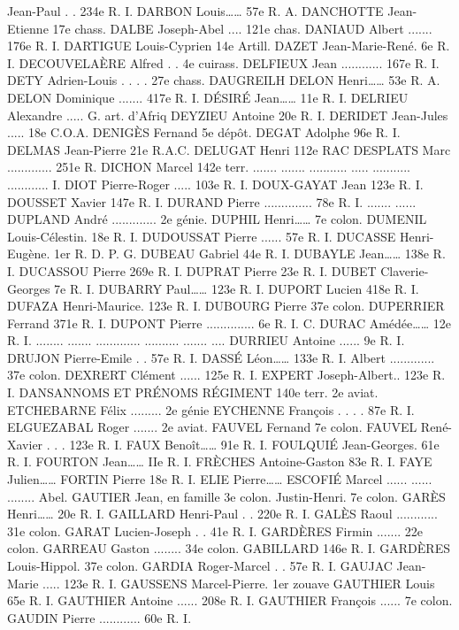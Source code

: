 \documentclass[a4paper,11pt]{book}
\begin{document}
Jean-Paul . . 234e R. I.
DARBON Louis……
57e R. A.
DANCHOTTE Jean-Etienne 17e chass.
DALBE Joseph-Abel .... 121e chas.
DANIAUD Albert ....... 176e R. I.
DARTIGUE Louis-Cyprien 14e Artill.
DAZET Jean-Marie-René. 6e R. I.
DECOUVELAÈRE Alfred . . 4e cuirass.
DELFIEUX Jean ............ 167e R. I.
DETY Adrien-Louis . . . . 27e chass.
DAUGREILH
DELON Henri……
53e R. A.
DELON Dominique ....... 417e R. I.
DÉSIRÉ Jean……
11e R. I.
DELRIEU Alexandre ..... G. art. d'Afriq
DEYZIEU Antoine
20e R. I.
DERIDET Jean-Jules ..... 18e C.O.A.
DENIGÈS Fernand
5e dépôt.
DEGAT Adolphe
96e R. I.
DELMAS Jean-Pierre
21e R.A.C.
DELUGAT Henri
112e RAC
DESPLATS Marc ............. 251e R.
DICHON Marcel
142e terr.
.......
.......
...........
.....
...........
............
I.
DIOT Pierre-Roger ..... 103e R. I.
DOUX-GAYAT Jean
123e R. I.
DOUSSET Xavier
147e R. I.
DURAND Pierre .............. 78e R. I.
.......
......
DUPLAND André ............. 2e génie.
DUPHIL Henri……
7e colon.
DUMENIL Louis-Célestin. 18e R. I.
DUDOUSSAT Pierre ...... 57e R. I.
DUCASSE Henri-Eugène. 1er R. D. P. G.
DUBEAU Gabriel
44e R. I.
DUBAYLE Jean……
138e R. I.
DUCASSOU Pierre
269e R. I.
DUPRAT Pierre
23e R. I.
DUBET Claverie-Georges 7e R. I.
DUBARRY Paul……
123e R. I.
DUPORT Lucien
418e R. I.
DUFAZA Henri-Maurice. 123e R. I.
DUBOURG Pierre
37e colon.
DUPERRIER Ferrand
371e R. I.
DUPONT Pierre .............. 6e R. I. C.
DURAC Amédée……
12e R. I.
........
.......
.............
..........
.......
....
DURRIEU Antoine
...... 9e R. I.
DRUJON Pierre-Emile . . 57e R. I.
DASSÉ Léon……
133e R. I.
Albert ............. 37e colon.
DEXRERT Clément ......
125e R. I.
EXPERT Joseph-Albert.. 123e R. I.
DANSANNOMS ET PRÉNOMS
RÉGIMENT
140e terr.
2e aviat.
ETCHEBARNE Félix ......... 2e génie
EYCHENNE François . . . . 87e R. I.
ELGUEZABAL Roger ....... 2e aviat.
FAUVEL Fernand
7e colon.
FAUVEL René-Xavier . . . 123e R. I.
FAUX Benoît……
91e R. I.
FOULQUIÉ Jean-Georges. 61e R. I.
FOURTON Jean……
IIe R. I.
FRÈCHES Antoine-Gaston 83e R. I.
FAYE Julien……
FORTIN Pierre
18e R. I.
ELIE Pierre……
ESCOFIÉ Marcel
......
......
........
Abel.
GAUTIER Jean, en famille
3e colon.
Justin-Henri. 7e colon.
GARÈS Henri……
20e R. I.
GAILLARD Henri-Paul . . 220e R. I.
GALÈS Raoul ............ 31e colon.
GARAT Lucien-Joseph . . 41e R. I.
GARDÈRES Firmin ....... 22e colon.
GARREAU Gaston ........
34e colon.
GABILLARD
146e R. I.
GARDÈRES Louis-Hippol. 37e colon.
GARDIA Roger-Marcel . . 57e R. I.
GAUJAC Jean-Marie ..... 123e R. I.
GAUSSENS Marcel-Pierre. 1er zouave
GAUTHIER Louis
65e R. I.
GAUTHIER Antoine ...... 208e R. I.
GAUTHIER François ...... 7e colon.
GAUDIN Pierre ............ 60e R. I.
\end{document}

